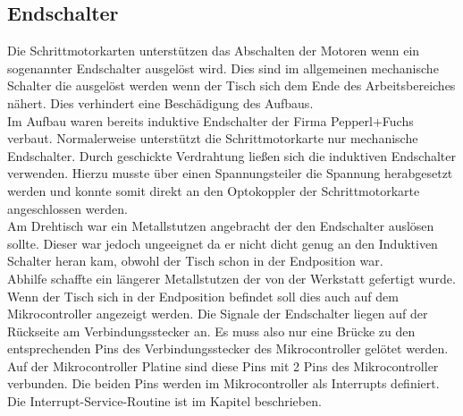 \subsection{Endschalter}
Die Schrittmotorkarten unterstützen das Abschalten der Motoren wenn ein sogenannter Endschalter ausgelöst wird. Dies sind im allgemeinen mechanische Schalter die ausgelöst werden wenn der Tisch sich dem Ende des Arbeitsbereiches nähert. Dies verhindert eine Beschädigung des Aufbaus.\\
Im Aufbau waren bereits induktive Endschalter der Firma Pepperl+Fuchs verbaut. 
Normalerweise unterstützt die Schrittmotorkarte nur mechanische Endschalter. Durch geschickte Verdrahtung ließen sich die induktiven Endschalter verwenden. Hierzu musste über einen Spannungsteiler die Spannung herabgesetzt werden und konnte somit direkt an den Optokoppler der Schrittmotorkarte angeschlossen werden. \\
Am Drehtisch war ein Metallstutzen angebracht der den Endschalter auslösen sollte. Dieser war jedoch ungeeignet da er nicht dicht genug an den Induktiven Schalter heran kam, obwohl der Tisch schon in der Endposition war.\\
Abhilfe schaffte ein längerer Metallstutzen der von der Werkstatt gefertigt wurde.\\
Wenn der Tisch sich in der Endposition befindet soll dies auch auf dem Mikrocontroller angezeigt werden. Die Signale der Endschalter liegen auf der Rückseite  am Verbindungsstecker an. Es muss also nur eine Brücke zu den entsprechenden Pins des Verbindungsstecker des Mikrocontroller gelötet werden.\\
Auf der Mikrocontroller Platine sind diese Pins mit 2 Pins des Mikrocontroller verbunden. Die beiden Pins werden im Mikrocontroller als Interrupts definiert. Die Interrupt-Service-Routine ist im Kapitel  beschrieben.

